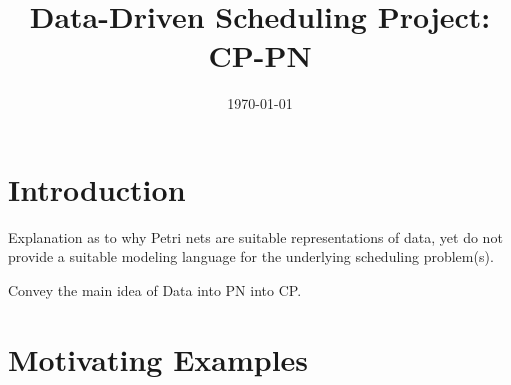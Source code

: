 \documentclass[11pt]{article}
\title{\LARGE Data-Driven Scheduling Project: CP-PN}
\author{}
\date{\today}
\newcommand{\todo}[1]{\textcolor{red}{\bf {#1}}}
\begin{document}
\maketitle

\section{Introduction}

Explanation as to why Petri nets are suitable representations of data, yet do not provide 
a suitable modeling language for the underlying scheduling problem(s).

Convey the main idea of Data into PN into CP.


%
%
%





\section{Motivating Examples}
\end{document}
